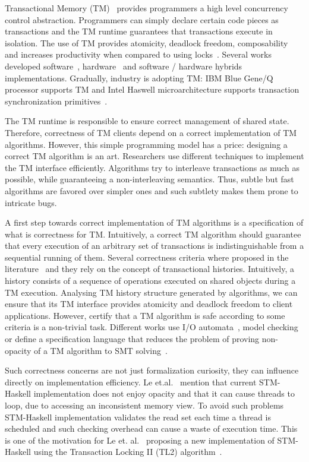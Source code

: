 \documentclass[sigplan]{acmart}
\theoremstyle{definition}
\begin{document}
Transactional Memory (TM)~\cite{Herlihy1993,Shavit1995} provides programmers a high level concurrency
control abstraction. Programmers can simply declare certain code pieces as
transactions and the TM runtime guarantees that transactions execute in isolation.
The use of TM provides atomicity, deadlock freedom, composability~\cite{Harris05} and
increases productivity when compared to using locks~\cite{Pankratius2011}. Several works developed
software~\cite{Herlihy2003,Herlihy2006,Dice06}, hardware~\cite{Hammond2004} and software / hardware hybrids~\cite{Baugh2008,Dalessandro2011}
implementations. Gradually, industry is adopting TM: IBM Blue Gene/Q processor supports TM and Intel Haswell microarchitecture
supports transaction synchronization primitives~\cite{TSX,Haring2012}.

The TM runtime is responsible to ensure correct management of shared state. Therefore,
correctness of TM clients depend on a correct implementation of TM algorithms. However,
this simple programming model has a price: designing a correct TM algorithm is an art.
Researchers use different techniques to implement the TM interface efficiently. Algorithms
try to interleave transactions as much as possible, while guaranteeing a non-interleaving
semantics. Thus, subtle but fast algorithms are favored over simpler ones and such subtlety
makes them prone to intricate bugs.


A first step towards correct implementation of TM algorithms is a specification of what
is correctness for TM. Intuitively, a correct TM algorithm should guarantee that every
execution of an arbitrary set of transactions is indistinguishable from a sequential
running of them. Several correctness criteria where proposed in the
literature~\cite{Guerraoui2008,Doherty2009,Imbs2009,LesaniP14} and
they rely on the concept of transactional histories. Intuitively,
a history consists of a sequence of operations executed on shared objects
during a TM execution. Analysing TM history structure generated by algorithms,
we can ensure that its TM interface provides atomicity and deadlock freedom to client
applications. However, certify that a TM algorithm is safe according to some criteria
is a non-trivial task. Different works use I/O automata~\cite{Lesani2012}, model
checking~\cite{CohenPZ08,cohen2007,Guerraoui2008a} or define a specification language that
reduces the problem of proving non-opacity of a TM algorithm to SMT solving~\cite{Lesani2013,DeMoura2008}.

Such correctness concerns are not just formalization curiosity, they can influence directly on implementation efficiency.
Le et.al.~\cite{Le2016} mention that current STM-Haskell implementation does not enjoy opacity and that it
can cause threads to loop, due to accessing an inconsistent memory view. To avoid such problems STM-Haskell
implementation validates the read set each time a thread is scheduled and such checking overhead can cause
a waste of execution time. This is one of the motivation for Le et. al.~\cite{Le2016} proposing a new
implementation of STM-Haskell using the Transaction Locking II (TL2) algorithm~\cite{Dice06}. 
\end{document}
